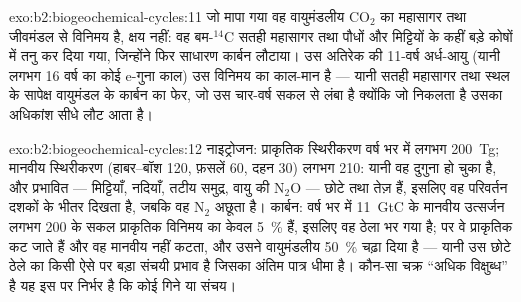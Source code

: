 \begin{solution}{exo:b2:biogeochemical-cycles:11}
जो मापा गया वह वायुमंडलीय $\mathrm{CO_2}$ का महासागर तथा जीवमंडल से
विनिमय है, क्षय नहीं: वह बम-$\mathrm{{}^{14}C}$
सतही महासागर तथा पौधों और मिट्टियों के कहीं बड़े कोषों में तनु कर दिया गया,
जिन्होंने फिर साधारण कार्बन लौटाया। उस अतिरेक की 11-वर्ष अर्ध-आयु
(यानी लगभग 16 वर्ष का कोई e-गुना काल) उस विनिमय का
काल-मान है --- यानी सतही महासागर तथा स्थल के सापेक्ष वायुमंडल के कार्बन का
फेर, जो उस चार-वर्ष सकल  से लंबा है क्योंकि जो निकलता है उसका
अधिकांश सीधे लौट आता है।
\end{solution}

\begin{solution}{exo:b2:biogeochemical-cycles:12}
नाइट्रोजन: प्राकृतिक स्थिरीकरण वर्ष भर में लगभग 200~Tg; मानवीय स्थिरीकरण
(हाबर--बॉश 120, फ़सलें 60, दहन 30) लगभग 210: यानी वह 
दुगुना हो चुका है, और प्रभावित  --- मिट्टियाँ, नदियाँ, तटीय
समुद्र, वायु की $\mathrm{N_2O}$ --- छोटे तथा तेज़ हैं, इसलिए वह परिवर्तन
दशकों के भीतर दिखता है, जबकि वह $\mathrm{N_2}$  अछूता है।
कार्बन: वर्ष भर में 11~GtC के मानवीय उत्सर्जन लगभग 200 के
सकल प्राकृतिक विनिमय का केवल \qty{5}{\%} हैं, इसलिए वह  ठेला भर गया है;
पर वे प्राकृतिक  कट जाते हैं और वह मानवीय नहीं कटता, और उसने
वायुमंडलीय  \qty{50}{\%} चढ़ा दिया है --- यानी उस छोटे
ठेले का किसी ऐसे  पर बड़ा संचयी प्रभाव है जिसका अंतिम पात्र धीमा
है। कौन-सा चक्र ``अधिक विक्षुब्ध'' है यह इस पर निर्भर है कि
कोई  गिने या संचय।
\end{solution}


